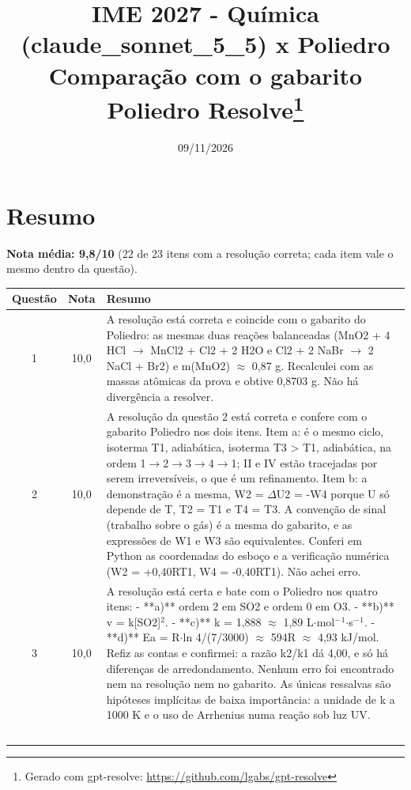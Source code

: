 \documentclass{article}%
\title{IME 2027 {-} Química (claude\_sonnet\_5\_5) x Poliedro\\[4pt]\large Comparação com o gabarito Poliedro Resolve\thanks{Gerado com gpt-resolve: \url{https://github.com/lgabs/gpt-resolve}}}%
\date{09/11/2026}%
\begin{document}
%
\normalsize%
\maketitle%
\section*{Resumo}\textbf{Nota média: 9,8/10} (22 de 23 itens com a resolução correta; cada item vale o mesmo dentro da questão).\par\medskip%
\begin{longtable}{@{}c c p{}@{}}\toprule Questão & Nota & Resumo \\ \midrule
1 & 10,0 & A resolução está correta e coincide com o gabarito do Poliedro: as mesmas duas reações balanceadas (MnO2 + 4 HCl $\to$ MnCl2 + Cl2 + 2 H2O e Cl2 + 2 NaBr $\to$ 2 NaCl + Br2) e m(MnO2) $\approx$ 0,87 g. Recalculei com as massas atômicas da prova e obtive 0,8703 g. Não há divergência a resolver. \\
2 & 10,0 & A resolução da questão 2 está correta e confere com o gabarito Poliedro nos dois itens. Item a: é o mesmo ciclo, isoterma T1, adiabática, isoterma T3 > T1, adiabática, na ordem 1$\to$2$\to$3$\to$4$\to$1; II e IV estão tracejadas por serem irreversíveis, o que é um refinamento. Item b: a demonstração é a mesma, W2 = $\Delta$U2 = -W4 porque U só depende de T, T2 = T1 e T4 = T3. A convenção de sinal (trabalho sobre o gás) é a mesma do gabarito, e as expressões de W1 e W3 são equivalentes. Conferi em Python as coordenadas do esboço e a verificação numérica (W2 = +0,40RT1, W4 = -0,40RT1). Não achei erro. \\
3 & 10,0 & A resolução está certa e bate com o Poliedro nos quatro itens:\newline%
{-} **a)** ordem 2 em SO2 e ordem 0 em O3.\newline%
{-} **b)** v = k{[}SO2{]}$^2$.\newline%
{-} **c)** k = 1,888 $\approx$ 1,89 L$\cdot$mol$^{-}$$^{1}$$\cdot$s$^{-}$$^{1}$.\newline%
{-} **d)** Ea = R$\cdot$ln 4/(7/3000) $\approx$ 594R $\approx$ 4,93 kJ/mol.\newline%
\newline%
Refiz as contas e confirmei: a razão k2/k1 dá 4,00, e só há diferenças de arredondamento. Nenhum erro foi encontrado nem na resolução nem no gabarito. As únicas ressalvas são hipóteses implícitas de baixa importância: a unidade de k a 1000 K e o uso de Arrhenius numa reação sob luz UV. \\
$$
\end{longtable}
\end{document}
